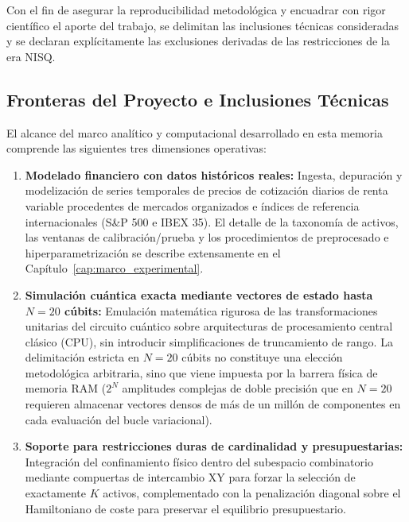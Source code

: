Con el fin de asegurar la reproducibilidad metodológica y encuadrar con rigor científico el aporte del trabajo, se delimitan las inclusiones técnicas consideradas y se declaran explícitamente las exclusiones derivadas de las restricciones de la era NISQ.

\subsection{Fronteras del Proyecto e Inclusiones Técnicas}
\label{subsec:inclusiones_tecnicas}

El alcance del marco analítico y computacional desarrollado en esta memoria comprende las siguientes tres dimensiones operativas:

\begin{enumerate}
    \item \textbf{Modelado financiero con datos históricos reales:} Ingesta, depuración y modelización de series temporales de precios de cotización diarios de renta variable procedentes de mercados organizados e índices de referencia internacionales (S\&P 500 e IBEX 35). El detalle de la taxonomía de activos, las ventanas de calibración/prueba y los procedimientos de preprocesado e hiperparametrización se describe extensamente en el Capítulo~\ref{cap:marco_experimental}.
    
    \item \textbf{Simulación cuántica exacta mediante vectores de estado hasta $N=20$ cúbits:} Emulación matemática rigurosa de las transformaciones unitarias del circuito cuántico sobre arquitecturas de procesamiento central clásico (CPU), sin introducir simplificaciones de truncamiento de rango. La delimitación estricta en $N=20$ cúbits no constituye una elección metodológica arbitraria, sino que viene impuesta por la barrera física de memoria RAM ($2^N$ amplitudes complejas de doble precisión que en $N=20$ requieren almacenar vectores densos de más de un millón de componentes en cada evaluación del bucle variacional).
    
    \item \textbf{Soporte para restricciones duras de cardinalidad y presupuestarias:} Integración del confinamiento físico dentro del subespacio combinatorio mediante compuertas de intercambio XY para forzar la selección de exactamente $K$ activos, complementado con la penalización diagonal sobre el Hamiltoniano de coste para preservar el equilibrio presupuestario.
\end{enumerate}

